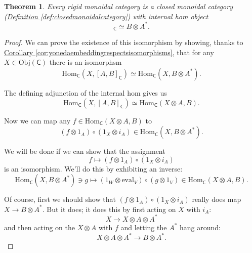 \documentclass[a4paper]{report}
\newcommand{\Obj}{\mathrm{Obj}}
\newcommand{\Hom}{\mathrm{Hom}}
\newcommand{\ev}{\mathrm{eval}}
\theoremstyle{definition}
\theoremstyle{plain}
\newtheorem{theorem}{Theorem}[section]
\theoremstyle{remark}
\begin{document}
\begin{theorem}
  Every rigid monoidal category is a closed monoidal category (\hyperref[def:closedmonoidalcategory]{Definition \ref*{def:closedmonoidalcategory}}) with internal hom object 
  \begin{equation*}
    [A, B]_{\mathsf{C}} \simeq B \otimes A^{*}.
  \end{equation*}
\end{theorem}
\begin{proof}
  We can prove the existence of this isomorphism by showing, thanks to \hyperref[cor:yonedaembeddingrespectsisomorphisms]{Corollary \ref*{cor:yonedaembeddingrespectsisomorphisms}}, that for any $X \in \Obj(\mathsf{C})$ there is an isomorphsm
  \begin{equation*}
    \Hom_{\mathsf{C}}(X, [A, B]_{\mathsf{C}}) \simeq \Hom_{\mathsf{C}}(X, B \otimes A^{*}).
  \end{equation*}

  The defining adjunction of the internal hom gives us 
  \begin{equation*}
    \Hom_{\mathsf{C}}(X, [A, B]_{\mathsf{C}}) \simeq \Hom_{\mathsf{C}}(X \otimes A, B).
  \end{equation*}

  Now we can map any $f \in \Hom_{\mathsf{C}}(X \otimes A, B)$ to
  \begin{equation*}
    (f \otimes 1_{A}) \circ (1_{X} \otimes i_{A}) \in \Hom_{\mathsf{C}}(X, B \otimes A^{*}).
  \end{equation*}

  We will be done if we can show that the assignment
  \begin{equation*}
    f \mapsto (f \otimes 1_{A}) \circ (1_{X} \otimes i_{A})
  \end{equation*}
  is an isomorphism. We'll do this by exhibiting an inverse:
  \begin{equation*}
    \Hom_{\mathsf{C}}(X, B \otimes A^{*}) \ni g \mapsto (1_{W} \otimes \ev_{V}) \circ (g \otimes 1_{V}) \in \Hom_{\mathsf{C}}(X \otimes A, B).
  \end{equation*}

  Of course, first we should show that $(f \otimes 1_{A}) \circ (1_{X} \otimes i_{A})$ really does map $X \to B \otimes A^{*}$. But it does; it does this by first acting on $X$ with $i_{A}$:
  \begin{equation*}
    X \to X \otimes A \otimes A^{*}
  \end{equation*}
  and then acting on the $X \otimes A$ with $f$ and letting the $A^{*}$ hang around:
  \begin{equation*}
    X \otimes A \otimes A^{*} \to B \otimes A^{*}.
  \end{equation*}


\end{proof}
\end{document}
